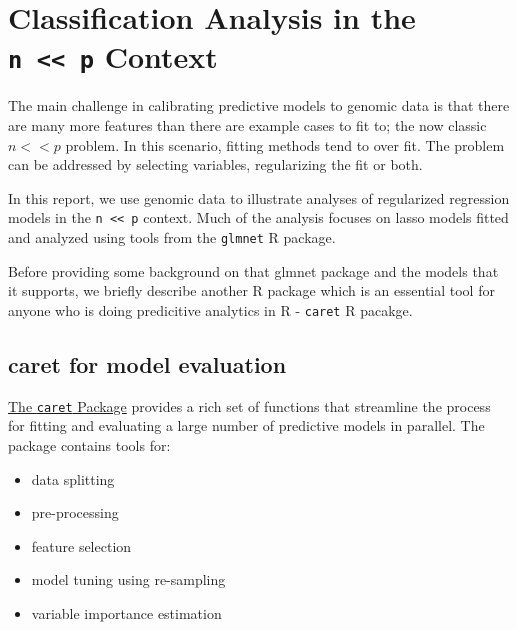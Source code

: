 \documentclass[
]{book}
\providecommand{\tightlist}{%
  \setlength{\itemsep}{0pt}\setlength{\parskip}{0pt}}
\begin{document}
\hypertarget{modeling-background}{%
\chapter{\texorpdfstring{Classification Analysis in the \texttt{n\ \textless{}\textless{}\ p} Context}{Classification Analysis in the n \textless\textless{} p Context}}\label{modeling-background}}

The main challenge in calibrating predictive models to genomic data is that
there are many more features than there are example cases to fit to;
the now classic \(n << p\) problem.
In this scenario, fitting methods tend to over fit. The problem
can be addressed by selecting variables, regularizing the fit or both.

In this report, we use genomic data to illustrate analyses of regularized regression
models in the \texttt{n\ \textless{}\textless{}\ p} context. Much of the analysis focuses on lasso models fitted
and analyzed using tools from the \texttt{glmnet} R package.

Before providing some background on that glmnet package and the
models that it supports, we briefly describe another R package
which is an essential tool for anyone who is doing predicitive analytics in R - \texttt{caret} R pacakge.

\hypertarget{caret-for-model-evaluation}{%
\section{caret for model evaluation}\label{caret-for-model-evaluation}}

\href{https://topepo.github.io/caret/index.html}{The \texttt{caret} Package}
provides a rich set of functions that streamline the process for fitting and
evaluating a large number of predictive models in parallel. The package contains tools for:

\begin{itemize}
\tightlist
\item
  data splitting\\
\item
  pre-processing\\
\item
  feature selection\\
\item
  model tuning using re-sampling\\
\item
  variable importance estimation
\end{itemize}
\end{document}
